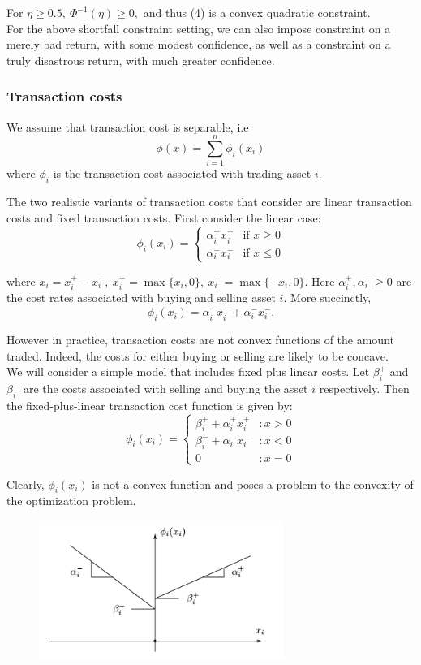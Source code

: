 \documentclass[a4paper]{article}
\begin{document}
For $\eta \geq 0.5,\ \Phi^{-1}(\eta) \geq 0,$ and thus (4) is a convex quadratic constraint.\\

For the above shortfall constraint setting, we can also impose constraint on a merely
bad return, with some modest confidence, as well as a constraint on a truly disastrous return,
with much greater confidence.

\subsubsection{Transaction costs}

We assume that transaction cost is separable, i.e
$$
\phi(x) =\sum_{i=1}^n \phi_i(x_i)
$$
where $\phi_i$ is the transaction cost associated with trading asset $i$.

The two realistic variants of transaction costs that consider are linear transaction costs and fixed transaction costs. First consider the linear case:
\[
 \phi_i(x_i) =
  \begin{cases}
   \alpha_i^{+}x_i^+ & \text{if } x \geq 0 \\
   \alpha_i^{-}x_i^-       & \text{if } x \leq 0
  \end{cases}
\]

where $x_i = x_i^+ - x_i ^-,\ x_i^+ = \max\{x_i,0 \},\ x_i^- = \max\{-x_i,0\}$. Here $\alpha_i^+, \alpha_i^- \geq 0$ are the cost rates associated with buying and selling asset $i$. More succinctly, 
$$
\phi_i(x_i)= \alpha_i^{+}x_i^+ + \alpha_i^{-}x_i^-.
$$  

However in practice, transaction costs are not convex functions of the amount traded. Indeed, the
costs for either buying or selling are likely to be concave\cite{2}.\\
 We will consider a simple model that includes fixed
plus linear costs. Let $\beta_i^+$ and $\beta_i^-$ are the costs associated with selling and buying the asset $i$ respectively. Then the fixed-plus-linear transaction cost function is given by:
\[
 \phi_i(x_i) =
  \begin{cases}
   \beta_i^+ + \alpha_i^{+}x_i^+ &:  x > 0 \\
   \beta_i^- + \alpha_i^{-}x_i^-       &: x < 0\\
   0 &: x=0
  \end{cases}
\]

Clearly, $\phi_i(x_i)$ is not a convex function and poses a problem to the convexity of the optimization problem.

\begin{figure}[h]
\centering
\includegraphics[width=8cm]{img.png}

\end{figure}
\newpage
\end{document}

